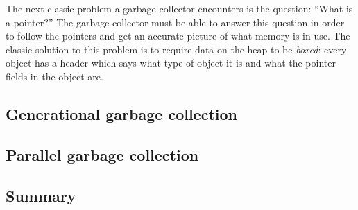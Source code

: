 The next classic problem a garbage collector encounters is the question:
``What is a pointer?''  The garbage collector must be able to answer
this question in order to follow the pointers and get an accurate
picture of what memory is in use.  The classic solution to this problem
is to require data on the heap to be \emph{boxed}: every object has
a header which says what type of object it is and what the pointer fields
in the object are.

\subsection{Generational garbage collection}

\subsection{Parallel garbage collection}

\subsection{Summary}
